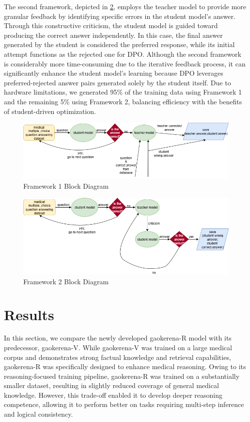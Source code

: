 \documentclass[conference]{IEEEtran}
\begin{document}
 The second framework, depicted in \ref{fig2}, employs the teacher model to provide more granular feedback by identifying specific errors in the student model’s answer. Through this constructive criticism, the student model is guided toward producing the correct answer independently. In this case, the final answer generated by the student is considered the preferred response, while its initial attempt functions as the rejected one for DPO. Although the second framework is considerably more time-consuming due to the iterative feedback process, it can significantly enhance the student model’s learning because DPO leverages preferred-rejected answer pairs generated solely by the student itself. Due to hardware limitations, we generated 95\% of the training data using Framework 1 and the remaining 5\% using Framework 2, balancing efficiency with the benefits of student-driven optimization.
\begin{figure}[h]
    \centering
    \includegraphics[width=1.0\linewidth]{fig1.png}
    \caption{Framework 1 Block Diagram}
    \label{fig1}
\end{figure}

\begin{figure}[h]
    \centering
    \includegraphics[width=1.0\linewidth]{fig2.png}
    \caption{Framework 2 Block Diagram}
    \label{fig2}
\end{figure}


          \section{Results}
In this section, we compare the newly developed gaokerena-R model with its predecessor, gaokerena-V. While gaokerena-V was trained on a large medical corpus and demonstrates strong factual knowledge and retrieval capabilities, gaokerena-R was specifically designed to enhance medical reasoning. Owing to its reasoning-focused training pipeline, gaokerena-R was trained on a substantially smaller dataset, resulting in slightly reduced coverage of general medical knowledge. However, this trade-off enabled it to develop deeper reasoning competence, allowing it to perform better on tasks requiring multi-step inference and logical consistency.  
\end{document}
